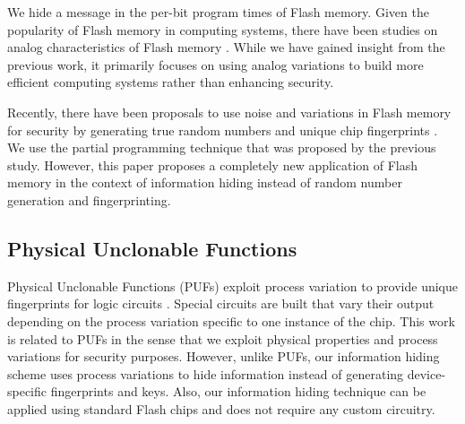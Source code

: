 We hide a message in the per-bit program times of Flash memory.
Given the popularity of Flash memory in computing systems, there
have been studies on analog characteristics of Flash memory
\cite{grupp2009}. While we have gained insight from the previous work,
it primarily focuses on using analog variations to build
more efficient computing systems rather than enhancing security.

Recently, there have been proposals to use noise and variations
in Flash memory for security by generating true random numbers
and unique chip fingerprints \cite{trust2011, flash-ieeesp2012}.
We use the partial programming technique that was proposed by
the previous study. However, this paper proposes a completely
new application of Flash memory in the context of information
hiding instead of random number generation and fingerprinting.

\subsection{Physical Unclonable Functions}

Physical Unclonable Functions (PUFs) exploit process variation
to provide unique fingerprints for logic circuits
\cite{suhpuf2007}. Special circuits are built that vary their
output depending on the process variation specific to one
instance of the chip. This work is related to PUFs in the sense
that we exploit physical properties and process variations for
security purposes. However, unlike PUFs, our information
hiding scheme uses process variations to hide information
instead of generating device-specific fingerprints and keys.
Also, our information hiding technique can be applied using
standard Flash chips and does not require any custom circuitry.

